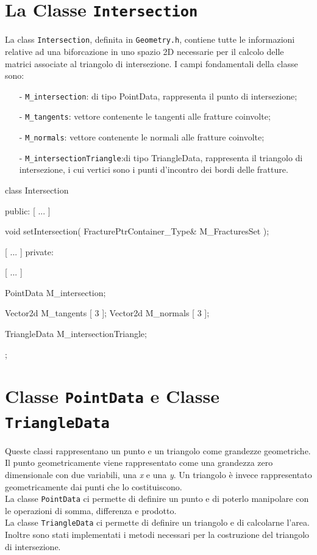 \section{La Classe \texttt{Intersection}}

La class \texttt{Intersection}, definita in \texttt{Geometry.h}, contiene tutte le informazioni relative ad una biforcazione in uno spazio 2D necessarie per il calcolo delle matrici associate al triangolo di intersezione.
I campi fondamentali della classe sono:
	\begin{enumerate}
	\item[-] \texttt{M\_intersection}: di tipo PointData, rappresenta il punto di intersezione;
	\item[-] \texttt{M\_tangents}: vettore contenente le tangenti alle fratture coinvolte;
	\item[-] \texttt{M\_normals}: vettore contenente le normali alle fratture coinvolte;
	\item[-] \texttt{M\_intersectionTriangle}:di tipo TriangleData, rappresenta il triangolo di intersezione, i cui vertici sono i punti d'incontro dei bordi delle fratture.
	\end{enumerate} 

\begin{Code03_03}[caption={Classe \texttt{Intersection}}]
class Intersection
{
 public:
	[ ... ]
	
	void setIntersection( FracturePtrContainer_Type& M_FracturesSet );
	
	[ ... ]
 private:
	
	[ ... ]	
	
	PointData M_intersection;
	
	Vector2d M_tangents [ 3 ];
	Vector2d M_normals [ 3 ];
	
	TriangleData M_intersectionTriangle;
};	
\end{Code03_03}

\section{Classe \texttt{PointData} e Classe \texttt{TriangleData}}
Queste classi rappresentano un punto e un triangolo come grandezze geometriche.
Il punto geometricamente viene rappresentato come una grandezza zero dimensionale con due variabili, una \textit{x} e una \textit{y}.
Un triangolo è invece  rappresentato geometricamente dai punti che lo costituiscono.\\
\noindent La classe \texttt{PointData} ci permette di definire un punto e di poterlo manipolare con le operazioni di somma, differenza e prodotto.\\
\noindent La classe \texttt{TriangleData} ci permette di definire un triangolo e di calcolarne l'area. Inoltre sono stati implementati i metodi necessari per la costruzione del triangolo di intersezione.
